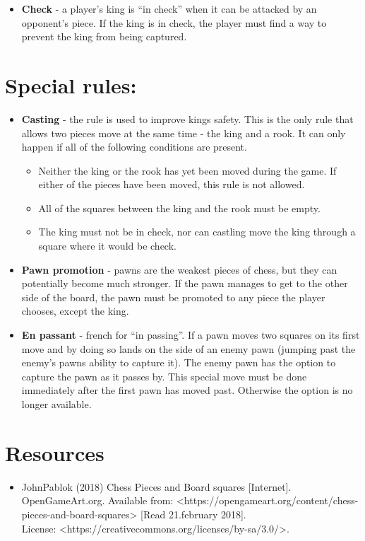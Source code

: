 \documentclass{article}
\begin{document}
\begin{itemize}
    \textit{(JohnPablok, 2018)}
    
    \item \textbf{Check} - a player’s king is “in check” when it can be attacked by an opponent’s piece. If the king is in check, the player must find a way to prevent the king from being captured.
\end{itemize}

\section{Special rules:}
\begin{itemize}

\item \textbf{Casting} - the rule is used to improve kings safety.  This is the only rule that allows two pieces move at the same time - the king and a rook. It can only happen if all of the following conditions are present.

\begin{itemize}
   \item Neither the king or the rook has yet been moved during the game. If either of the pieces have been moved, this rule is not allowed. 
   \item All of the squares between the king and the rook must be empty.
   \item The king must not be in check, nor can castling move the king through a square where it would be check. 
   \end{itemize}

\item \textbf{Pawn promotion} - pawns are the weakest pieces of chess, but they can potentially become much stronger. If the pawn manages to get to the other side of the board, the pawn must be promoted to any piece the player chooses, except the king. 

\item \textbf{En passant} - french for “in passing”. If a pawn moves two squares on its first move and by doing so lands on the side of an enemy pawn (jumping past the enemy’s pawns ability to capture it). The enemy pawn has the option to capture the pawn as it passes by. This special move must be done immediately after the first pawn has moved past. Otherwise the option is no longer available. 
\end{itemize}

\section{Resources}
\begin{itemize}
\item JohnPablok (2018) Chess Pieces and Board squares [Internet]. \\
	  OpenGameArt.org.
	  Available from: \textless https://opengameart.org/content/chess-pieces-and-board-squares\textgreater
	  [Read 21.february 2018].\\
	  License: \textless https://creativecommons.org/licenses/by-sa/3.0/\textgreater .
\end{itemize}
\end{document}
